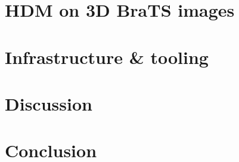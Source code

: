 \chapter{HDM on 3D BraTS images}



\chapter{Infrastructure \& tooling}


\chapter{Discussion}


\chapter{Conclusion}

